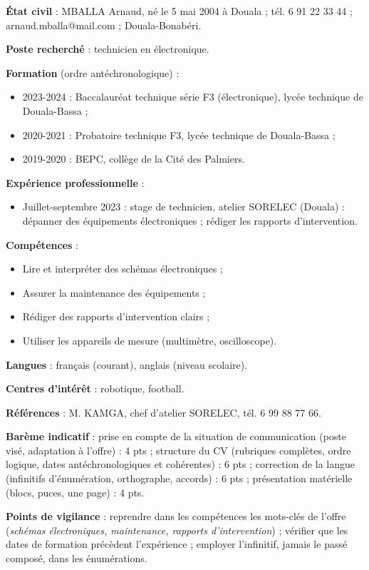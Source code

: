 \documentclass[11pt]{article}
\begin{document}
\begin{corrige}
\textbf{État civil} : MBALLA Arnaud, né le 5 mai 2004 à Douala ; tél. 6 91 22 33 44 ; arnaud.mballa@mail.com ; Douala-Bonabéri.

\textbf{Poste recherché} : technicien en électronique.

\textbf{Formation} (ordre antéchronologique) :
\begin{itemize}
\item 2023-2024 : Baccalauréat technique série F3 (électronique), lycée technique de Douala-Bassa ;
\item 2020-2021 : Probatoire technique F3, lycée technique de Douala-Bassa ;
\item 2019-2020 : BEPC, collège de la Cité des Palmiers.
\end{itemize}

\textbf{Expérience professionnelle} :
\begin{itemize}
\item Juillet-septembre 2023 : stage de technicien, atelier SORELEC (Douala) : dépanner des équipements électroniques ; rédiger les rapports d'intervention.
\end{itemize}

\textbf{Compétences} :
\begin{itemize}
\item Lire et interpréter des schémas électroniques ;
\item Assurer la maintenance des équipements ;
\item Rédiger des rapports d'intervention clairs ;
\item Utiliser les appareils de mesure (multimètre, oscilloscope).
\end{itemize}

\textbf{Langues} : français (courant), anglais (niveau scolaire).

\textbf{Centres d'intérêt} : robotique, football.

\textbf{Références} : M. KAMGA, chef d'atelier SORELEC, tél. 6 99 88 77 66.

\textbf{Barème indicatif} : prise en compte de la situation de communication (poste visé, adaptation à l'offre) : 4 pts ; structure du CV (rubriques complètes, ordre logique, dates antéchronologiques et cohérentes) : 6 pts ; correction de la langue (infinitifs d'énumération, orthographe, accords) : 6 pts ; présentation matérielle (blocs, puces, une page) : 4 pts.

\textbf{Points de vigilance} : reprendre dans les compétences les mots-clés de l'offre (\emph{schémas électroniques, maintenance, rapports d'intervention}) ; vérifier que les dates de formation précèdent l'expérience ; employer l'infinitif, jamais le passé composé, dans les énumérations.
\end{corrige}
\end{document}
